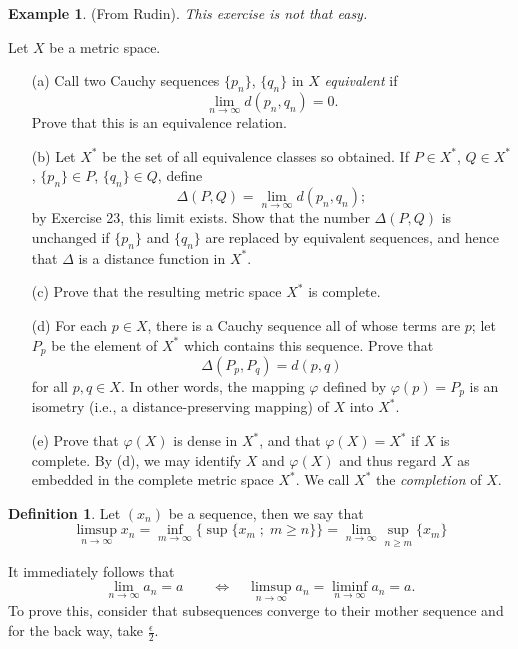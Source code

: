 \documentclass[10pt, oneside]{article}
\theoremstyle{definition}
\newtheorem{exmp}{Example}[section]
\newtheorem{defn}{Definition}
\begin{document}
\begin{exmp} (From Rudin). \textit{This exercise is not that easy.}


    Let \( X \) be a metric space.

\begin{enumerate}
    \item[(a)] Call two Cauchy sequences \(\{p_n\}\), \(\{q_n\}\) in \( X \) \textit{equivalent} if
    \[
    \lim_{n \to \infty} d(p_n, q_n) = 0.
    \]
    Prove that this is an equivalence relation.

    \item[(b)] Let \( X^* \) be the set of all equivalence classes so obtained. If \( P \in X^* \), \( Q \in X^* \), \(\{p_n\} \in P\), \(\{q_n\} \in Q\), define
    \[
    \Delta(P, Q) = \lim_{n \to \infty} d(p_n, q_n);
    \]
    by Exercise 23, this limit exists. Show that the number \( \Delta(P, Q) \) is unchanged if \(\{p_n\}\) and \(\{q_n\}\) are replaced by equivalent sequences, and hence that \( \Delta \) is a distance function in \( X^* \).

    \item[(c)] Prove that the resulting metric space \( X^* \) is complete.

    \item[(d)] For each \( p \in X \), there is a Cauchy sequence all of whose terms are \( p \); let \( P_p \) be the element of \( X^* \) which contains this sequence. Prove that
    \[
    \Delta(P_p, P_q) = d(p, q)
    \]
    for all \( p, q \in X \). In other words, the mapping \( \varphi \) defined by \( \varphi(p) = P_p \) is an isometry (i.e., a distance-preserving mapping) of \( X \) into \( X^* \).

    \item[(e)] Prove that \( \varphi(X) \) is dense in \( X^* \), and that \( \varphi(X) = X^* \) if \( X \) is complete. By (d), we may identify \( X \) and \( \varphi(X) \) and thus regard \( X \) as embedded in the complete metric space \( X^* \). We call \( X^* \) the \textit{completion} of \( X \).
\end{enumerate}
\end{exmp}
\begin{defn}
    Let $(x_n)$ be  a sequence, then we say that 
    \[\limsup_{n\to \infty} x_n =  \inf_{m\to \infty} \{\sup \{x_m \; ; \; m \geq n\}\} = \lim_{n\to \infty}\sup_{n\geq m}\{x_m\}\]
\end{defn}
It immediately follows that \[\lim_{n\to \infty} a_n = a\qquad \iff \quad \limsup_{n\to \infty} a_n = \liminf_{n\to \infty} a_n = a.\] To prove this, consider that subsequences converge to their mother sequence and for the back way, take $\frac{\epsilon}{2}.$
\end{document}

